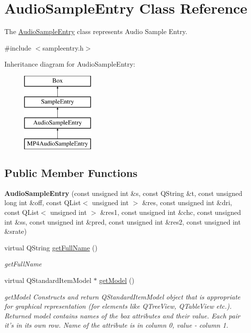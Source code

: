 \hypertarget{class_audio_sample_entry}{\section{Audio\-Sample\-Entry Class Reference}
\label{class_audio_sample_entry}
}


The \hyperlink{class_audio_sample_entry}{Audio\-Sample\-Entry} class represents Audio Sample Entry.  




{\ttfamily \#include $<$sampleentry.\-h$>$}

Inheritance diagram for Audio\-Sample\-Entry\-:\begin{figure}[H]
\begin{center}
\leavevmode
\includegraphics[height=4.000000cm]{class_audio_sample_entry}
\end{center}
\end{figure}
\subsection*{Public Member Functions}
\begin{DoxyCompactItemize}
\item 
\hypertarget{class_audio_sample_entry_ab3fcf3bd3dcd181f3df3c08a62c50506}{{\bfseries Audio\-Sample\-Entry} (const unsigned int \&s, const Q\-String \&t, const unsigned long int \&off, const Q\-List$<$ unsigned int $>$ \&res, const unsigned int \&dri, const Q\-List$<$ unsigned int $>$ \&res1, const unsigned int \&chc, const unsigned int \&ss, const unsigned int \&pred, const unsigned int \&res2, const unsigned int \&srate)}\label{class_audio_sample_entry_ab3fcf3bd3dcd181f3df3c08a62c50506}

\item 
virtual Q\-String \hyperlink{class_audio_sample_entry_a928ab5498c0a8679ed624f9089dc5825}{get\-Full\-Name} ()
\begin{DoxyCompactList}\small\item\em get\-Full\-Name \end{DoxyCompactList}\item 
virtual Q\-Standard\-Item\-Model $\ast$ \hyperlink{class_audio_sample_entry_a8666027778c6cf9438d4af902c1793ab}{get\-Model} ()
\begin{DoxyCompactList}\small\item\em get\-Model Constructs and return Q\-Standard\-Item\-Model object that is appropriate for graphical representation (for elements like Q\-Tree\-View, Q\-Table\-View etc.). Returned model contains names of the box attributes and their value. Each pair it's in its own row. Name of the attribute is in column 0, value -\/ column 1. \end{DoxyCompactList}\end{DoxyCompactItemize}
